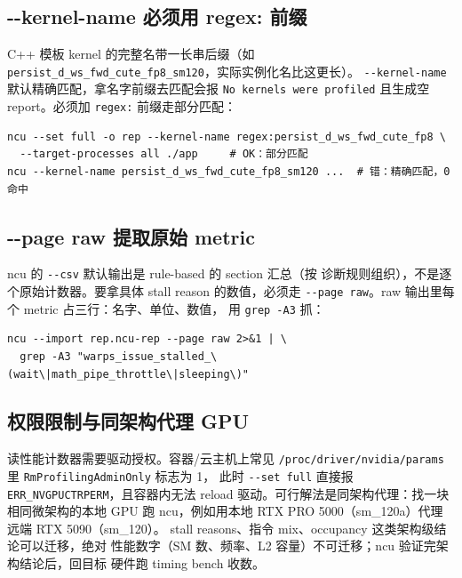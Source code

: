 \subsection{-{}-kernel-name 必须用 regex: 前缀}

C++ 模板 kernel 的完整名带一长串后缀（如
\texttt{persist\_\allowbreak{}d\_\allowbreak{}ws\_\allowbreak{}fwd\_\allowbreak{}cute\_\allowbreak{}fp8\_\allowbreak{}sm120}，实际实例化名比这更长）。
\texttt{-{}-kernel-name} 默认精确匹配，拿名字前缀去匹配会报
\texttt{No kernels were profiled} 且生成空 report。必须加 \texttt{regex:}
前缀走部分匹配：

\begin{lstlisting}[style=console, title={kernel 名过滤：regex 前缀}]
ncu --set full -o rep --kernel-name regex:persist_d_ws_fwd_cute_fp8 \
  --target-processes all ./app     # OK：部分匹配
ncu --kernel-name persist_d_ws_fwd_cute_fp8_sm120 ...  # 错：精确匹配，0 命中
\end{lstlisting}

\subsection{-{}-page raw 提取原始 metric}

ncu 的 \texttt{-{}-csv} 默认输出是 rule-based 的 section 汇总（按
诊断规则组织），不是逐个原始计数器。要拿具体 stall reason 的数值，必须走
\texttt{-{}-page raw}。raw 输出里每个 metric 占三行：名字、单位、数值，
用 \texttt{grep -A3} 抓：

\begin{lstlisting}[style=console, title={从 raw page 提取 stall 指标}]
ncu --import rep.ncu-rep --page raw 2>&1 | \
  grep -A3 "warps_issue_stalled_\(wait\|math_pipe_throttle\|sleeping\)"
\end{lstlisting}

\subsection{权限限制与同架构代理 GPU}

读性能计数器需要驱动授权。容器/云主机上常见
\texttt{/proc/\allowbreak{}driver/\allowbreak{}nvidia/\allowbreak{}params} 里
\texttt{Rm\allowbreak{}Profiling\allowbreak{}Admin\allowbreak{}Only} 标志为 1，
此时 \texttt{-{}-set full} 直接报 \texttt{ERR\_\allowbreak{}NVGPUCTRPERM}，且容器内无法
reload 驱动。可行解法是同架构代理：找一块相同微架构的本地 GPU 跑
ncu，例如用本地 RTX PRO 5000（sm\_120a）代理远端 RTX 5090（sm\_120）。
stall reasons、指令 mix、occupancy 这类架构级结论可以迁移，绝对
性能数字（SM 数、频率、L2 容量）不可迁移；ncu 验证完架构结论后，回目标
硬件跑 timing bench 收数。

